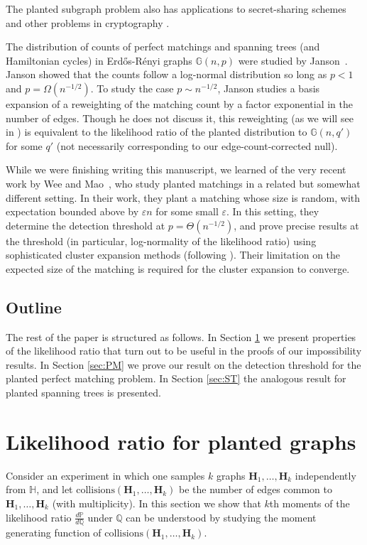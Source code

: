 \documentclass[11pt]{article}
\newcommand{\bH}{\mathbf{H}}
\newcommand{\bbG}{\mathbb{G}}
\newcommand{\bbH}{\mathbb{H}}
\newcommand{\bbP}{\mathbb{P}}
\newcommand{\bbQ}{\mathbb{Q}}
\numberwithin{equation}{section}
\numberwithin{thm}{section}
\begin{document}
The planted subgraph problem also has applications to secret-sharing schemes and other problems in cryptography \cite{MR4872490, MR4697144}. 

The distribution of counts of perfect matchings and spanning trees (and Hamiltonian cycles) in Erd\H{o}s-R\'enyi graphs $\bbG(n,p)$ were studied by Janson~\cite{janson1994numbers}. 
Janson showed that the counts follow a log-normal distribution so long as $p<1$ and $p = \Omega(n^{-1/2})$. 
To study the case $p \sim n^{-1/2}$, Janson studies a basis expansion of a reweighting of the matching count by a factor exponential in the number of edges.
Though he does not discuss it, this reweighting (as we will see in ) is equivalent to the likelihood ratio of the planted distribution to $\mathbb{G}(n,q')$ for some $q'$ (not necessarily corresponding to our edge-count-corrected null).

While we were finishing writing this manuscript, we learned of the very recent work by Wee and Mao~\cite{wee2025cluster}, who study planted matchings in a related but somewhat different setting.
In their work, they plant a matching whose size is random, with expectation bounded above by $\varepsilon n$ for some small $\varepsilon$. 
In this setting, they determine the detection threshold at $p = \Theta(n^{-1/2})$, and prove precise results at the threshold (in particular, log-normality of the likelihood ratio) using sophisticated cluster expansion methods (following \cite{janson1994numbers}). 
Their limitation on the expected size of the matching is required for the cluster expansion to converge. 
\subsection{Outline}
The rest of the paper is structured as follows. In Section \ref{sec:LR} we present properties of the likelihood ratio that turn out to be useful in the proofs of our impossibility results.
In Section \ref{sec:PM} we prove our result on the detection threshold for the planted perfect matching problem. In Section \ref{sec:ST} the analogous result for planted spanning trees is presented.

\section{Likelihood ratio for planted graphs}
\label{sec:LR}
Consider an experiment in which one samples $k$ graphs $\bH_1,\ldots,\bH_k$ independently from $\bbH$, and let $\mathrm{collisions}(\bH_1,\ldots,\bH_k)$ be the number of edges common to $\bH_1,\ldots,\bH_k$ (with multiplicity).
In this section we show that $k$th moments of the likelihood ratio $\frac{d\bbP}{d\bbQ}$ under $\bbQ$ can be understood by studying the moment generating function of $\mathrm{collisions}(\bH_1,\ldots,\bH_k)$.
\end{document}
